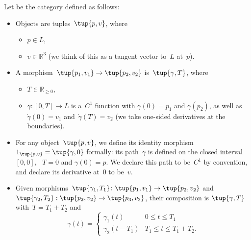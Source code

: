 \begin{definition}
Let \Berg be the category defined as follows:
\begin{itemize}
\item Objects are tuples~$\tup{p,v}$, where
\begin{itemize}
\item $p \in L$,
\item $v \in \mathbb{R}^3$ (we think of this as a tangent vector to~$L$ at~$p$).
\end{itemize}

\item A morphism~$\tup{p_1, v_1} \rightarrow \tup{p_2, v_2}$ is~$\tup{\gamma, T}$,
where
\begin{itemize}
\item $T \in \mathbb{R}_{\geq 0}$,
\item $\gamma \colon [0, T] \to L$ is a~$C^1$ function with $\gamma(0)=p_1$ and $\gamma(p_2)$, as well as ~$\dot \gamma(0) = v_1$ and~$\dot \gamma(T) = v_2$  (we take one-sided derivatives at the boundaries).
\end{itemize}

\item For any object~$\tup{p, v}$, we define its identity morphism~$1_{\tup{p,v}} = \tup{\gamma, 0}$ formally: its path~$\gamma$ is defined on the closed interval~$[0,0]$, ~$T= 0$ and $\gamma(0) = p$. We declare this path to be~$C^1$ by convention, and declare its derivative at~$0$ to be~$v$.

\item Given morphisms~$\tup{\gamma_1, T_1}\colon \tup{p_1, v_1} \to \tup{p_2, v_2}$ and~$\tup{\gamma_2, T_2}: \tup{p_2, v_2} \to \tup{p_3, v_3}$, their composition is $\tup{\gamma, T}$ with~$T = T_1 + T_2$ and
\begin{equation}
 \gamma(t) = \begin{cases}
 \gamma_1(t) &0 \leq t \leq T_1 \\
\gamma_2(t - T_1) & T_1 \leq t \leq T_1 + T_2.
 \end{cases}
\end{equation}
\end{itemize}
\end{definition}

